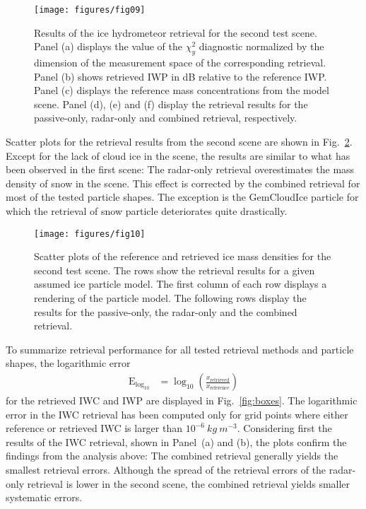 \documentclass[journal abbreviation, manuscript]{copernicus}
\begin{document}
\begin{figure}
\centering
\texttt{[image: figures/fig09]}
\caption{Results of the ice hydrometeor retrieval for the second test scene.
  Panel (a) displays the value of the $\chi^2_y$ diagnostic normalized by the
  dimension of the measurement space of the corresponding retrieval. Panel (b)
  shows retrieved IWP in dB relative to the reference IWP. Panel (c) displays
  the reference mass concentrations from the model scene. Panel (d), (e) and (f)
  display the retrieval results for the passive-only, radar-only and combined
  retrieval, respectively.}
\label{fig:results_b}
\end{figure}

Scatter plots for the retrieval results from the second scene are shown in
Fig.~\ref{fig:results_scatter_b_1}. Except for the lack of cloud ice in the
scene, the results are similar to what has been observed in the first scene: The
radar-only retrieval overestimates the mass density of snow in the scene. This
effect is corrected by the combined retrieval for most of the tested particle
shapes. The exception is the GemCloudIce particle for which the retrieval of
snow particle deteriorates quite drastically.

\begin{figure}[!h]
\centering
\texttt{[image: figures/fig10]}
\caption{Scatter plots of the reference and retrieved ice mass densities for
  the second test scene. The rows show the retrieval results for a given
  assumed ice particle model. The first column of each row displays a rendering
  of the particle model. The following rows display the results for the
  passive-only, the radar-only and the combined retrieval.}
\label{fig:results_scatter_b_1}
\end{figure}

To summarize retrieval performance for all tested retrieval methods and particle
shapes, the logarithmic error
\begin{align}
  \text{E}_{\text{log}_{10}} &= \log_\text{10} \left (\frac{x_\text{retrieved}}{x_\text{reference}} \right )
\end{align}
for the retrieved IWC and IWP are displayed in Fig.~\ref{fig:boxes}. The
logarithmic error in the IWC retrieval has been computed only for grid points
where either reference or retrieved IWC is larger than
$10^{-6}\ \unit{kg\ m^{-3}}$. Considering first the results of the IWC
retrieval, shown in Panel~(a) and (b), the plots confirm the findings from the
analysis above: The combined retrieval generally yields the smallest retrieval
errors. Although the spread of the retrieval errors of the radar-only retrieval
is lower in the second scene, the combined retrieval yields smaller systematic
errors.
\end{document}
